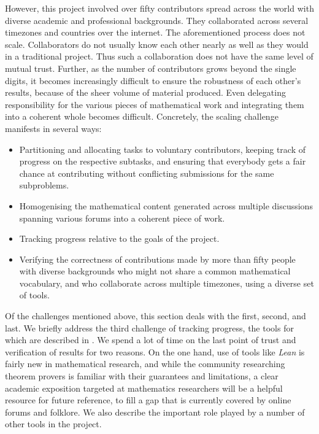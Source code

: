 However, this project involved over fifty contributors spread across the world with diverse academic and professional backgrounds. They collaborated across several timezones and countries over the internet. The aforementioned process does not scale. Collaborators do not usually know each other nearly as well as they would in a traditional project. Thus such a collaboration does not have the same level of mutual trust. Further, as the number of contributors grows beyond the single digits, it becomes increasingly difficult to ensure the robustness of each other's results, because of the sheer volume of material produced. Even delegating responsibility for the various pieces of mathematical work and integrating them into a coherent whole becomes difficult. Concretely, the scaling challenge manifests in several ways:
\begin{itemize}
    \item Partitioning and allocating tasks to voluntary contributors, keeping track of progress on the respective subtasks, and ensuring that everybody gets a fair chance at contributing without conflicting submissions for the same subproblems.
    \item Homogenising the mathematical content generated across multiple discussions spanning various forums into a coherent piece of work.
    \item Tracking progress relative to the goals of the project.
    \item Verifying the correctness of contributions made by more than fifty people with diverse backgrounds who might not share a common mathematical vocabulary, and who collaborate across multiple timezones, using a diverse set of tools.
\end{itemize}

Of the challenges mentioned above, this section deals with the first, second, and last. We briefly address the third challenge of tracking progress, the tools for which are described in . We spend a lot of time on the last point of trust and verification of results for two reasons. On the one hand, use of tools like \emph{Lean} is fairly new in mathematical research, and while the community researching theorem provers is familiar with their guarantees and limitations, a clear academic exposition targeted at mathematics researchers will be a helpful resource for future reference, to fill a gap that is currently covered by online forums and folklore. We also describe the important role played by a number of other tools in the project.

